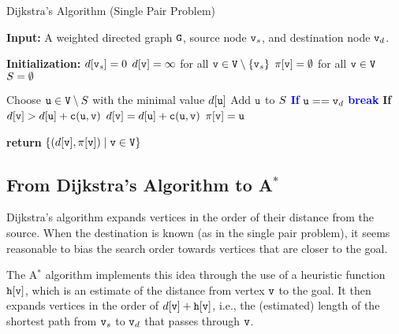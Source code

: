 \begin{algorithm}
\caption{Dijkstra's Algorithm (Single Pair Problem)}
\label{Alg:DijkstraSinglePair}
\begin{algorithmic}[1]
\State \textbf{Input:} A weighted directed graph ${\tt G}$, source node ${\tt v}_s$, and destination node ${\tt v}_d$.

\State \textbf{Initialization:} 
\State \quad $d[{\tt v}_s] = 0$
\State \quad $d[{\tt v}] = \infty$ for all ${\tt v} \in {\tt V} \setminus \{{\tt v}_s\}$
\State \quad $\pi[{\tt v}] = \emptyset$ for all ${\tt v} \in {\tt V}$
\State \quad ${S} = \emptyset$

\While{$\vertexset \neq \nodes$}
    \State Choose ${\tt u} \in {\tt V} \setminus {S}$ with the minimal value $d[{\tt u}]$
    \State Add ${\tt u}$ to ${S}$
    \State \textcolor{blue}{\textbf{If} {${\tt u} == {\tt v}_d$}}
        \State \quad \textcolor{blue}{\textbf{break}}
    \ForAll{$(\nodeu, \nodev) \in \edges$}
        \State \textbf{If} {$d[{\tt v}] > d[{\tt u}] + {\tt c}({\tt u}, {\tt v})$}
            \State \quad $d[{\tt v}] = d[{\tt u}] + {\tt c}({\tt u}, {\tt v})$
            \State \quad $\pi[{\tt v}] = {\tt u}$
    \EndFor
\EndWhile

\State \textbf{return} $\{(d[{\tt v}], \pi[{\tt v}]) \mid {\tt v} \in {\tt V}\}$
\end{algorithmic}
\end{algorithm}

\subsection{From Dijkstra's Algorithm to A$^*$}

Dijkstra's algorithm expands vertices in the order of their distance from the source. When the destination is known (as in the single pair problem), it seems reasonable to bias the search order towards vertices that are closer to the goal. 

The A$^*$ algorithm implements this idea through the use of a heuristic function ${\tt h}[{\tt v}]$, which is an estimate of the distance from vertex ${\tt v}$ to the goal. It then expands vertices in the order of $d[{\tt v}] + {\tt h}[{\tt v}]$, i.e., the (estimated) length of the shortest path from ${\tt v}_s$ to ${\tt v}_d$ that passes through ${\tt v}$.


